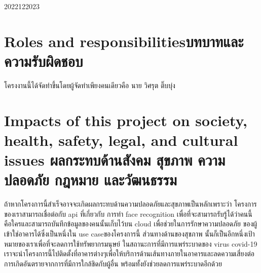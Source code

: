 \begin{plan}{12}{2022}{12}{2023}
\end{plan}

\section{\ifenglish Roles and responsibilities\else บทบาทและความรับผิดชอบ\fi}
โครงงานนี้ได้จัดทำขึ้นโดยผู้จัดทำเพียงคนเดียวคือ นาย วิศรุต ติ๊บบุ่ง

\section{\ifenglish%
Impacts of this project on society, health, safety, legal, and cultural issues
\else%
ผลกระทบด้านสังคม สุขภาพ ความปลอดภัย กฎหมาย และวัฒนธรรม
\fi}
ถ้าหากโครงการนี้สำเร็จอาจจะเกิดผลกระทบด้านความปลอดภัยและสุขภาพเป็นหลักเพราะว่า โครงการของเราสามารถเชื่อต่อกับ api ที่เกี่ยวกับ
การทำ face recognition เพื่อที่จะสามารถรับรู้ได้ว่าคนนี้คือใครและสามารถบันทึกข้อมูลของคนนั้นเก็บไว้บน cloud เพื่อช่วยในการรักษาความปลอดภัย
ของผู้เข้าใช่อาคารได้ซึ่งเป็นหนึ่งใน use caseของโครงการนี้ ส่วนทางด้านของสุขภาพ นั้นก็เป็นอีกหนึ่งเป้าหมายของเราเพื่อที่จะลดการใช้ทรัพยากรมนุษย์ 
ในสถานะการที่มีการแพร่ระบาดของ virus covid-19 เราจะนำโครงการนี้ไปติดตั้งที่อาคารต่างๆเพื่อให้บริการด้านเส้นทางภายในอาคารและลดความเสี่ยงต่อ
การเกิดอันตรายจากการที่มีการใกล้ชิดกับผู้อื่น พร้อมทั้งยังช่วยลดการแพร่ระบาดอีกด้วย